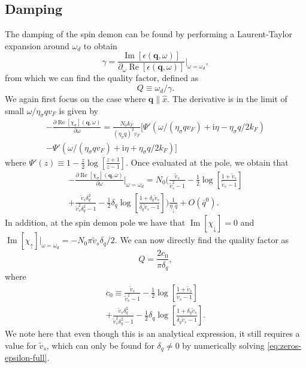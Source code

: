 \documentclass[aps,prb,reprint,twocolumns,superscriptaddress,nofootinbib]{revtex4-2}
\newcommand{\ii}{\mathrm{i}}
\DeclareMathOperator{\Imm}{Im}
\DeclareMathOperator{\Ree}{Re}
\newcommand{\kF}{k_{F}}
\begin{document}
		\subsection{Damping}
	\label{sec:damping}
	The damping of the spin demon can be found by performing a Laurent-Taylor expansion around $\omega_d$ to obtain 
	\begin{equation}
		\gamma = \frac{\Imm[\epsilon(\bm q,\omega)]}{\partial_\omega \Ree[\epsilon(\bm q,\omega)]}\Bigr|_{\omega=\omega_d},
	\end{equation}
	from which we can find the quality factor, defined as 
	\begin{equation}
		Q \equiv \omega_d / \gamma.
	\end{equation}
	We again first focus on the case where $\bm q\parallel\hat x$. The derivative is in the limit of small $\omega / \eta_\sigma q v_F$ is given by \cite{giulianiQuantumTheoryElectron2005}
	\begin{multline}
		-\frac{\partial\Ree[\chi_\sigma](\bm q,\omega)}{\partial\omega} = \frac{N_0 \kF}{( \eta_\sigma q)^2 v_F} [ \Psi'\left(\omega / (\eta_\sigma q v_F) + \ii \eta - \eta_\sigma q/2\kF \right) 
		\\
		- \Psi'\left(\omega / (\eta_\sigma q v_F) + \ii \eta + \eta_\sigma q/2\kF \right) 
		] 
	\end{multline}
	where $\Psi'(z)\equiv 1- \frac{z}{2}\log\left[\frac{z+1}{z-1}\right]$. 
	Once evaluated at the pole, we obtain that 
	\begin{multline}
		-\frac{\partial\Ree[\chi_\sigma](\bm q,\omega)}{\partial\omega}\Bigr|_{\omega=\omega_d} = 	N_0\Biggl(\frac{\tilde v_s}{\tilde v_s^2 - 1} - \frac{1}{2} \log\left[\frac{1+\tilde v_s}{\tilde v_s-1}\right] \\ 
		+ \frac{\tilde v_s \delta_q^2}{\tilde v_s^2\delta_q^2-1}- \frac{1}{2} \delta_q \log\left[\frac{1+\delta_q\tilde v_s}{\delta_q\tilde v_s-1}\right] \Biggl)\frac{1}{\eta_\downarrow \bar q} +O\left(\bar q^0\right).
	\end{multline}
	In addition, at the spin demon pole we have that $\Imm[\chi_\downarrow]=0$ and $\Imm[\chi_{\uparrow}]|_{\omega=\omega_d}=-N_0\pi \tilde v_s \delta_q/2$. We can now directly find the quality factor as
	\begin{equation}
		Q = \frac{2 c_0}{\pi\delta_q},
	\end{equation}
	where \begin{multline}
		c_0 \equiv \frac{\tilde v_s}{\tilde v_s^2 - 1} - \frac{1}{2} \log\left[\frac{1+\tilde v_s}{\tilde v_s-1} \right] \\
		+ \frac{\tilde v_s \delta_q^2}{\tilde v_s^2\delta_q^2-1}- \frac{1}{2} \delta_q \log\left[\frac{1+\delta_q\tilde v_s}{\delta_q\tilde v_s-1}\right].
	\end{multline}
	We note here that even though this is an analytical expression, it still requires a value for $\tilde v_s$, which can only be found for $\delta_q\neq 0$ by numerically solving \cref{eq:zeros-epsilon-full}.
	
\end{document}
